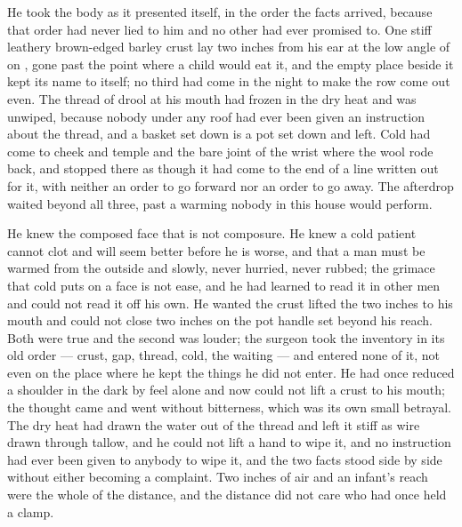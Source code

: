 \scenebreak

He took the body as it presented itself, in the order the facts arrived, because that order had never lied to him and no other had ever promised to. One stiff leathery brown-edged barley crust lay two inches from his ear at the low angle of  on , gone past the point where a child would eat it, and the empty place beside it kept its name to itself; no third had come in the night to make the row come out even. The thread of drool at his mouth had frozen in the dry heat and was unwiped, because nobody under any roof had ever been given an instruction about the thread, and a basket set down is a pot set down and left. Cold had come to cheek and temple and the bare joint of the wrist where the wool rode back, and stopped there as though it had come to the end of a line written out for it, with neither an order to go forward nor an order to go away. The afterdrop waited beyond all three, past a warming nobody in this house would perform.

He knew the composed face that is not composure. He knew a cold patient cannot clot and will seem better before he is worse, and that a man must be warmed from the outside and slowly, never hurried, never rubbed; the grimace that cold puts on a face is not ease, and he had learned to read it in other men and could not read it off his own. He wanted the crust lifted the two inches to his mouth and could not close two inches on the pot handle set beyond his reach. Both were true and the second was louder; the surgeon took the inventory in its old order --- crust, gap, thread, cold, the waiting --- and entered none of it, not even on the place where he kept the things he did not enter. He had once reduced a shoulder in the dark by feel alone and now could not lift a crust to his mouth; the thought came and went without bitterness, which was its own small betrayal. The dry heat had drawn the water out of the thread and left it stiff as wire drawn through tallow, and he could not lift a hand to wipe it, and no instruction had ever been given to anybody to wipe it, and the two facts stood side by side without either becoming a complaint. Two inches of air and an infant's reach were the whole of the distance, and the distance did not care who had once held a clamp.

\scenebreak

